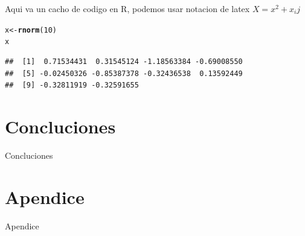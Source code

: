 \documentclass[12pt, twoside]{report}\usepackage[]{graphicx}\usepackage[]{color}
\makeatletter
\newcommand{\hlnum}[1]{\textcolor[rgb]{0.686,0.059,0.569}{#1}}%
\newcommand{\hlstd}[1]{\textcolor[rgb]{0.345,0.345,0.345}{#1}}%
\newcommand{\hlkwb}[1]{\textcolor[rgb]{0.69,0.353,0.396}{#1}}%
\newcommand{\hlkwd}[1]{\textcolor[rgb]{0.737,0.353,0.396}{\textbf{#1}}}%
\newenvironment{kframe}{%
 \def\at@end@of@kframe{}%
 \ifinner\ifhmode%
  \def\at@end@of@kframe{\end{minipage}}%
  \begin{minipage}{\columnwidth}%
 \fi\fi%
 \def\FrameCommand##1{\hskip\@totalleftmargin \hskip-\fboxsep
 \colorbox{shadecolor}{##1}\hskip-\fboxsep
     \hskip-\linewidth \hskip-\@totalleftmargin \hskip\columnwidth}%
 \MakeFramed {\advance\hsize-\width
   \@totalleftmargin\z@ \linewidth\hsize
   \@setminipage}}%
 {\par\unskip\endMakeFramed%
 \at@end@of@kframe}
\newenvironment{knitrout}{}{} %
\makeatother
\begin{document}
Aqui va un cacho de codigo en R, podemos usar notacion de latex
$X=x^2 + x_ij$

\begin{knitrout}
\color{fgcolor}\begin{kframe}
\begin{alltt}
\hlstd{x} \hlkwb{<-} \hlkwd{rnorm}\hlstd{(}\hlnum{10}\hlstd{)}
\hlstd{x}
\end{alltt}
\begin{verbatim}
##  [1]  0.71534431  0.31545124 -1.18563384 -0.69008550
##  [5] -0.02450326 -0.85387378 -0.32436538  0.13592449
##  [9] -0.32811919 -0.32591655
\end{verbatim}
\end{kframe}
\end{knitrout}


\chapter{Concluciones}

Concluciones

\appendix
\chapter{Apendice}

Apendice
\end{document}

